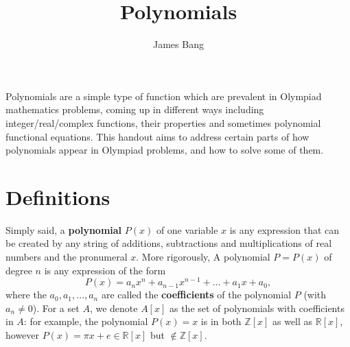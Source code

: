 \documentclass[12pt]{article}
\title{Polynomials}
\author{James Bang}
\begin{document}
\maketitle

\noindent Polynomials are a simple type of function which are prevalent in Olympiad mathematics problems, coming up in different ways including integer/real/complex functions, their properties and sometimes polynomial functional equations. This handout aims to address certain parts of how polynomials appear in Olympiad problems, and how to solve some of them.
\section{Definitions}

\noindent Simply said, a \textbf{polynomial} $P(x)$ of one variable $x$ is any expression that can be created by any string of additions, subtractions and multiplications of real numbers and the pronumeral $x$. More rigorously, A polynomial $P=P(x)$ of degree $n$ is any expression of the form \[P(x)=a_nx^n+a_{n-1}x^{n-1}+\dots+a_1x+a_0,\] where the $a_0,a_1,\dots,a_n$ are called the \textbf{coefficients} of the polynomial $P$ (with $a_n\neq 0$). For a set $A$, we denote $A[x]$ as the set of polynomials with coefficients in $A$: for example, the polynomial $P(x)=x$ is in both $\mathbb{Z}[x]$ as well as $\mathbb{R}[x]$, however $P(x)=\pi x+e\in \mathbb{R}[x]$ but $\not\in \mathbb{Z}[x]$.

\vspace{2mm}
\end{document}
